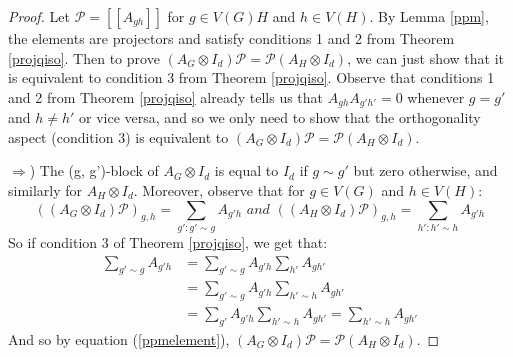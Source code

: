 \documentclass[12pt]{article}
\begin{document}
\begin{proof}
Let $\mathcal{P} = [[A_{gh}]]$ for $g \in V(G)H$ and $h \in V(H)$. By
Lemma \ref{ppm}, the elements are projectors and satisfy conditions 1
and 2 from Theorem \ref{projqiso}. Then to prove $(A_G \otimes
I_d)\mathcal{P} = \mathcal{P} (A_H \otimes I_d)$, we can just show
that it is equivalent to condition 3 from Theorem
\ref{projqiso}. Observe that conditions 1 and 2 from Theorem
\ref{projqiso} already tells us that $A_{gh}A_{g'h'} = 0$ whenever $g
= g'$ and $h \neq h'$ or vice versa, and so we only need to show that
the orthogonality aspect (condition 3) is equivalent to $(A_G \otimes
I_d)\mathcal{P} = \mathcal{P} (A_H \otimes I_d)$.

$\Rightarrow$) The (g, g')-block of $A_G \otimes I_d$ is equal to
$I_d$ if $g \sim g'$ but zero otherwise, and similarly for $A_H
\otimes I_d$. Moreover, observe that for $g \in V(G)$ and $h \in
V(H)$:
\begin{equation}
\label{ppmelement}
((A_G \otimes I_d)\mathcal{P})_{g,h} = \sum_{g':g' \sim g} A_{g'h}
\textit{ and } ((A_H \otimes I_d)\mathcal{P})_{g,h} = \sum_{h':h' \sim
  h} A_{g'h}
\end{equation} 
So if condition 3 of Theorem \ref{projqiso}, we get that:
\begin{align*}
\sum_{g' \sim g} A_{g'h} &= \sum_{g' \sim g} A_{g'h} \sum_{h'} A_{gh'} \\
&= \sum_{g' \sim g} A_{g'h} \sum_{h' \sim h} A_{gh'}\\ &= \sum_{g'}
A_{g'h} \sum_{h' \sim h} A_{gh'} = \sum_{h' \sim h} A_{gh'}
\end{align*}
And so by equation (\ref{ppmelement}), $(A_G \otimes I_d)\mathcal{P} =
\mathcal{P} (A_H \otimes I_d)$.


\end{proof}
\end{document}
